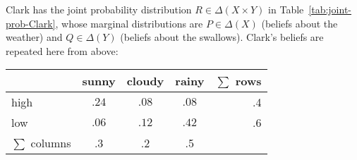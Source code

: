 \documentclass[nobib,nofonts]{tufte-handout}
\begin{document}
\begin{example}
  Clark has the joint probability distribution $R \in \Delta(X \times Y)$ in Table~\ref{tab:joint-prob-Clark}, whose marginal distributions are $P \in \Delta(X)$ (beliefs about the weather) and $Q \in \Delta(Y)$ (beliefs about the swallows).
  Clark's beliefs are repeated here from above:
  \begin{center}
    \begin{tabular}{lcccr}
                     & sunny & cloudy & rainy & $\sum$ rows \\ \midrule
      high           & $.24$ & $.08$  & $.08$ & .4 \\
      low            & $.06$ & $.12$  & $.42$ & .6 \\ \midrule
      $\sum$ columns & .3    & .2     & .5
    \end{tabular}


\end{center}
\end{example}
\end{document}
